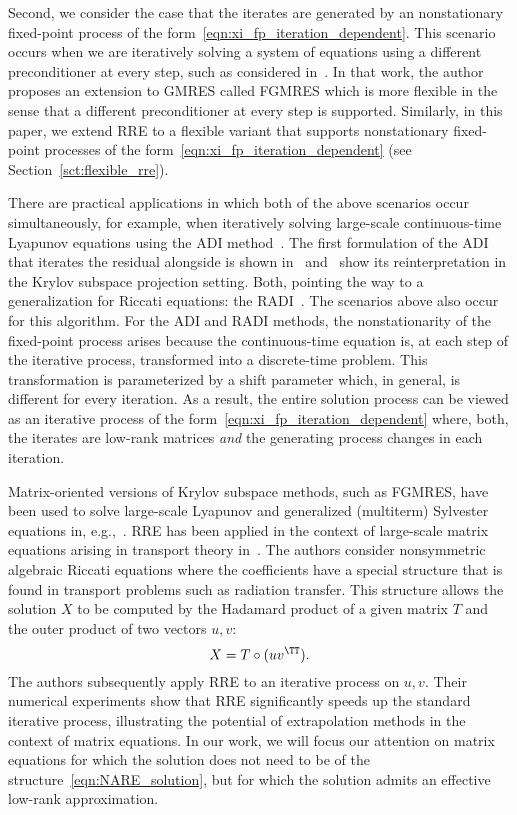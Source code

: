 Second, we consider the case that the iterates are generated by an nonstationary fixed-point process of the form~\eqref{eqn:xi_fp_iteration_dependent}.
This scenario occurs when we are iteratively solving a system of equations using a different preconditioner at every step, such as considered in~\cite{saad1993flexible}.
In that work, the author proposes an extension to \ac{GMRES} called \ac{FGMRES} which is more flexible in the sense that a different preconditioner at every step is supported.
Similarly, in this paper, we extend \ac{RRE} to a flexible variant that supports nonstationary fixed-point processes of the form~\eqref{eqn:xi_fp_iteration_dependent} (see Section~\ref{sct:flexible_rre}).

There are practical applications in which both of the above scenarios occur simultaneously,
for example, when iteratively solving large-scale continuous-time Lyapunov equations using the \ac{ADI} method~\cite{penzl1999cyclic,li2002low,SchS24}. %
The first formulation of the \ac{ADI} that iterates the residual alongside is
shown in~\cite{morBenKS13} and~\cite{WolP16} show its reinterpretation in the
Krylov subspace projection setting. Both, pointing the way to a generalization for Riccati equations: the RADI~\cite{benner2018radi}.
The scenarios above also occur for this algorithm.
For the \ac{ADI} and RADI methods, the nonstationarity of the fixed-point process arises because the continuous-time equation is, at each step of the iterative process, transformed into a discrete-time problem.
This transformation is parameterized by a shift parameter which, in general, is different for every iteration.
As a result, the entire solution process can be viewed as an iterative process
of the form~\eqref{eqn:xi_fp_iteration_dependent} where, both, the iterates are
low-rank matrices \emph{and} the generating process changes in each iteration.

Matrix-oriented versions of Krylov subspace methods, such as \ac{FGMRES}, have been used to solve large-scale Lyapunov and generalized (multiterm) Sylvester equations in, e.g.,~\cite{bollhofer2012structure,PalK2021,SimHao23}.
\Ac{RRE} has been applied in the context of large-scale matrix equations arising in transport theory in~\cite{el2013vector}.
The authors consider nonsymmetric algebraic Riccati equations where the coefficients have a special structure that is found in transport problems such as radiation transfer.
This structure allows the solution $X$ to be computed by the Hadamard product of a given matrix $T$ and the outer product of two vectors $u, v$:
\begin{equation}
	X = T \circ (u v^\TT).
	\label{eqn:NARE_solution}
\end{equation}
The authors subsequently apply \ac{RRE} to an iterative process on $u, v$.
Their numerical experiments show that \ac{RRE} significantly speeds up the standard iterative process, illustrating the potential of extrapolation methods in the context of matrix equations.
In our work, we will focus our attention on matrix equations for which the solution does not need to be of the structure~\eqref{eqn:NARE_solution}, but for which the solution admits an effective low-rank approximation.

